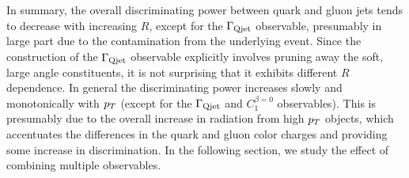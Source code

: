 


In summary, the overall discriminating power between quark and gluon jets tends to
 decrease with increasing $R$, except for the $\Gamma_{\rm Qjet}$ observable, presumably in large part due to the
 contamination from the underlying event. Since the construction of the $\Gamma_{\rm Qjet}$ observable explicitly
involves pruning away the soft, large angle constituents, it is not surprising that it exhibits different $R$ dependence. 
In general the discriminating power increases slowly and monotonically
with $p_T$ (except for the $\Gamma_{\rm Qjet}$ and $C_1^{\beta=0}$ observables). This is presumably due to the overall
increase in radiation from high $p_T$ objects, which accentuates the differences in the quark and gluon color charges and 
 providing some increase in discrimination.  
In the following section, we study the effect of combining multiple observables.

